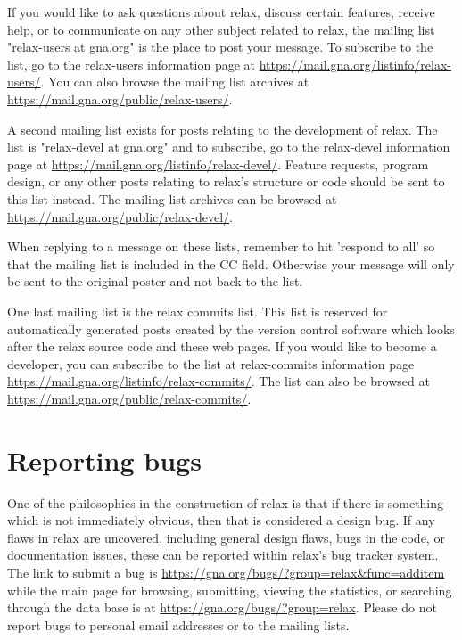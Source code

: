 If you would like to ask questions about relax, discuss certain features, receive help, or to communicate on any other subject related to relax, the mailing list "relax-users at gna.org" is the place to post your message.  To subscribe to the list, go to the relax-users information page at \href{https://mail.gna.org/listinfo/relax-users/}{https://mail.gna.org/listinfo/relax-users/}.  You can also browse the mailing list archives at \href{https://mail.gna.org/public/relax-users/}{https://mail.gna.org/public/relax-users/}.

A second mailing list exists for posts relating to the development of relax.  The list is "relax-devel at gna.org" and to subscribe, go to the relax-devel information page at \href{https://mail.gna.org/listinfo/relax-devel/}{https://mail.gna.org/listinfo/relax-devel/}.  Feature requests, program design, or any other posts relating to relax's structure or code should be sent to this list instead.  The mailing list archives can be browsed at \href{https://mail.gna.org/public/relax-devel/}{https://mail.gna.org/public/relax-devel/}.

When replying to a message on these lists, remember to hit 'respond to all' so that the mailing list is included in the CC field.  Otherwise your message will only be sent to the original poster and not back to the list.

One last mailing list is the relax commits list.  This list is reserved for automatically generated posts created by the version control software which looks after the relax source code and these web pages.  If you would like to become a developer, you can subscribe to the list at relax-commits information page \href{https://mail.gna.org/listinfo/relax-commits/}{https://mail.gna.org/listinfo/relax-commits/}. The list can also be browsed at \href{https://mail.gna.org/public/relax-commits/}{https://mail.gna.org/public/relax-commits/}.




\section{Reporting bugs}

One of the philosophies in the construction of relax is that if there is something which is not immediately obvious, then that is considered a design bug.  If any flaws in relax are uncovered, including general design flaws, bugs in the code, or documentation issues, these can be reported within relax's bug tracker system.  The link to submit a bug is \href{https://gna.org/bugs/?group=relax\&func=additem}{https://gna.org/bugs/?group=relax\&func=additem} while the main page for browsing, submitting, viewing the statistics, or searching through the data base is at \href{https://gna.org/bugs/?group=relax}{https://gna.org/bugs/?group=relax}.  Please do not report bugs to personal email addresses or to the mailing lists.

